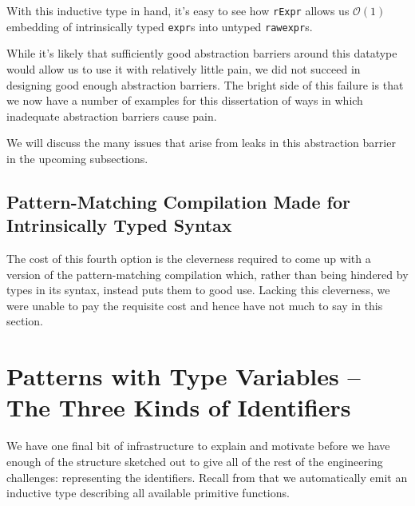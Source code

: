 With this inductive type in hand, it's easy to see how \texttt{rExpr} allows us $\mathcal{O}(1)$ embedding of intrinsically typed \texttt{expr}s into untyped \texttt{rawexpr}s.

While it's likely that sufficiently good abstraction barriers around this datatype would allow us to use it with relatively little pain, we did not succeed in designing good enough abstraction barriers.
The bright side of this failure is that we now have a number of examples for this dissertation of ways in which inadequate abstraction barriers cause pain.

We will discuss the many issues that arise from leaks in this abstraction barrier in the upcoming subsections.


\subsection{Pattern-Matching Compilation Made for Intrinsically Typed Syntax}\label{sec:rewriting-more:AST:better-pattern-matching}
The cost of this fourth option is the cleverness required to come up with a version of the pattern-matching compilation which, rather than being hindered by types in its syntax, instead puts them to good use.
Lacking this cleverness, we were unable to pay the requisite cost and hence have not much to say in this section.

\section{Patterns with Type Variables -- The Three Kinds of Identifiers}\label{sec:rewriting-more:three-identifier-inductives}
We have one final bit of infrastructure to explain and motivate before we have enough of the structure sketched out to give all of the rest of the engineering challenges: representing the identifiers.
Recall from  that we automatically emit an inductive type describing all available primitive functions.

